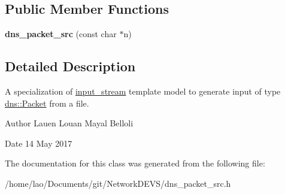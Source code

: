 \subsection*{Public Member Functions}
\begin{DoxyCompactItemize}
\item 
{\bfseries dns\+\_\+packet\+\_\+src} (const char $\ast$n)\hypertarget{classdns__packet__src_a6b057e9ffb6aa7fbbf52262e34a6d85c}{}\label{classdns__packet__src_a6b057e9ffb6aa7fbbf52262e34a6d85c}

\end{DoxyCompactItemize}


\subsection{Detailed Description}
A specialization of \hyperlink{classinput__stream}{input\+\_\+stream} template model to generate input of type \hyperlink{structdns_1_1Packet}{dns\+::\+Packet} from a file. 

\begin{DoxyAuthor}{Author}
Lauen Louan Mayal Belloli 
\end{DoxyAuthor}
\begin{DoxyDate}{Date}
14 May 2017 
\end{DoxyDate}


The documentation for this class was generated from the following file\+:\begin{DoxyCompactItemize}
\item 
/home/lao/\+Documents/git/\+Network\+D\+E\+V\+S/dns\+\_\+packet\+\_\+src.\+h\end{DoxyCompactItemize}
